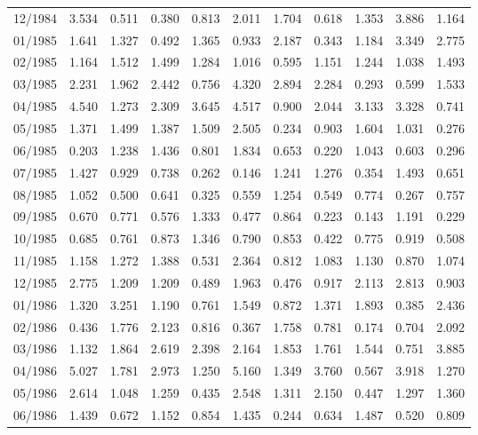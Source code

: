 \begin{tabular}{lrrrrrrrrrr}
12/1984 &  3.534 &  0.511 &  0.380 &  0.813 &  2.011 &  1.704 &  0.618 &  1.353 &  3.886 &  1.164 \\
01/1985 &  1.641 &  1.327 &  0.492 &  1.365 &  0.933 &  2.187 &  0.343 &  1.184 &  3.349 &  2.775 \\
02/1985 &  1.164 &  1.512 &  1.499 &  1.284 &  1.016 &  0.595 &  1.151 &  1.244 &  1.038 &  1.493 \\
03/1985 &  2.231 &  1.962 &  2.442 &  0.756 &  4.320 &  2.894 &  2.284 &  0.293 &  0.599 &  1.533 \\
04/1985 &  4.540 &  1.273 &  2.309 &  3.645 &  4.517 &  0.900 &  2.044 &  3.133 &  3.328 &  0.741 \\
05/1985 &  1.371 &  1.499 &  1.387 &  1.509 &  2.505 &  0.234 &  0.903 &  1.604 &  1.031 &  0.276 \\
06/1985 &  0.203 &  1.238 &  1.436 &  0.801 &  1.834 &  0.653 &  0.220 &  1.043 &  0.603 &  0.296 \\
07/1985 &  1.427 &  0.929 &  0.738 &  0.262 &  0.146 &  1.241 &  1.276 &  0.354 &  1.493 &  0.651 \\
08/1985 &  1.052 &  0.500 &  0.641 &  0.325 &  0.559 &  1.254 &  0.549 &  0.774 &  0.267 &  0.757 \\
09/1985 &  0.670 &  0.771 &  0.576 &  1.333 &  0.477 &  0.864 &  0.223 &  0.143 &  1.191 &  0.229 \\
10/1985 &  0.685 &  0.761 &  0.873 &  1.346 &  0.790 &  0.853 &  0.422 &  0.775 &  0.919 &  0.508 \\
11/1985 &  1.158 &  1.272 &  1.388 &  0.531 &  2.364 &  0.812 &  1.083 &  1.130 &  0.870 &  1.074 \\
12/1985 &  2.775 &  1.209 &  1.209 &  0.489 &  1.963 &  0.476 &  0.917 &  2.113 &  2.813 &  0.903 \\
01/1986 &  1.320 &  3.251 &  1.190 &  0.761 &  1.549 &  0.872 &  1.371 &  1.893 &  0.385 &  2.436 \\
02/1986 &  0.436 &  1.776 &  2.123 &  0.816 &  0.367 &  1.758 &  0.781 &  0.174 &  0.704 &  2.092 \\
03/1986 &  1.132 &  1.864 &  2.619 &  2.398 &  2.164 &  1.853 &  1.761 &  1.544 &  0.751 &  3.885 \\
04/1986 &  5.027 &  1.781 &  2.973 &  1.250 &  5.160 &  1.349 &  3.760 &  0.567 &  3.918 &  1.270 \\
05/1986 &  2.614 &  1.048 &  1.259 &  0.435 &  2.548 &  1.311 &  2.150 &  0.447 &  1.297 &  1.360 \\
06/1986 &  1.439 &  0.672 &  1.152 &  0.854 &  1.435 &  0.244 &  0.634 &  1.487 &  0.520 &  0.809 \\

\end{tabular}
